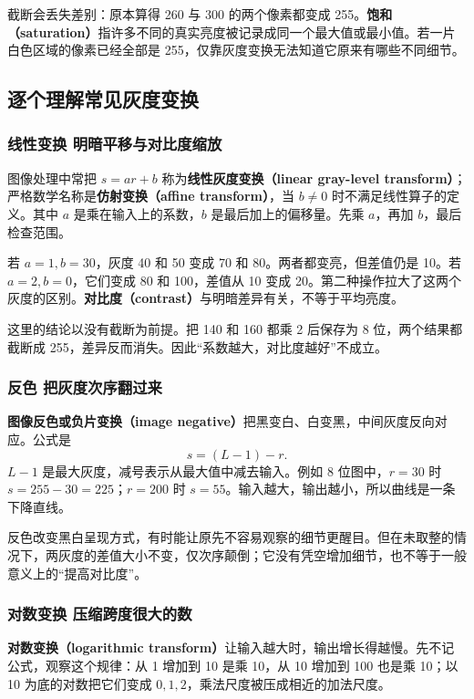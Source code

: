 截断会丢失差别：原本算得 260 与 300 的两个像素都变成 255。\textbf{饱和（saturation）}指许多不同的真实亮度被记录成同一个最大值或最小值。若一片白色区域的像素已经全部是 255，仅靠灰度变换无法知道它原来有哪些不同细节。

\subsection{逐个理解常见灰度变换}

\subsubsection*{线性变换 明暗平移与对比度缩放}

图像处理中常把 $s=ar+b$ 称为\textbf{线性灰度变换（linear gray-level transform）}；严格数学名称是\textbf{仿射变换（affine transform）}，当 $b\ne0$ 时不满足线性算子的定义。其中 $a$ 是乘在输入上的系数，$b$ 是最后加上的偏移量。先乘 $a$，再加 $b$，最后检查范围。

若 $a=1,b=30$，灰度 40 和 50 变成 70 和 80。两者都变亮，但差值仍是 10。若 $a=2,b=0$，它们变成 80 和 100，差值从 10 变成 20。第二种操作拉大了这两个灰度的区别。\textbf{对比度（contrast）}与明暗差异有关，不等于平均亮度。

这里的结论以没有截断为前提。把 140 和 160 都乘 2 后保存为 8 位，两个结果都截断成 255，差异反而消失。因此“系数越大，对比度越好”不成立。

\subsubsection*{反色 把灰度次序翻过来}

\textbf{图像反色或负片变换（image negative）}把黑变白、白变黑，中间灰度反向对应。公式是
\[
s=(L-1)-r.
\]
$L-1$ 是最大灰度，减号表示从最大值中减去输入。例如 8 位图中，$r=30$ 时 $s=255-30=225$；$r=200$ 时 $s=55$。输入越大，输出越小，所以曲线是一条下降直线。

反色改变黑白呈现方式，有时能让原先不容易观察的细节更醒目。但在未取整的情况下，两灰度的差值大小不变，仅次序颠倒；它没有凭空增加细节，也不等于一般意义上的“提高对比度”。

\subsubsection*{对数变换 压缩跨度很大的数}

\textbf{对数变换（logarithmic transform）}让输入越大时，输出增长得越慢。先不记公式，观察这个规律：从 1 增加到 10 是乘 10，从 10 增加到 100 也是乘 10；以 10 为底的对数把它们变成 $0,1,2$，乘法尺度被压成相近的加法尺度。

